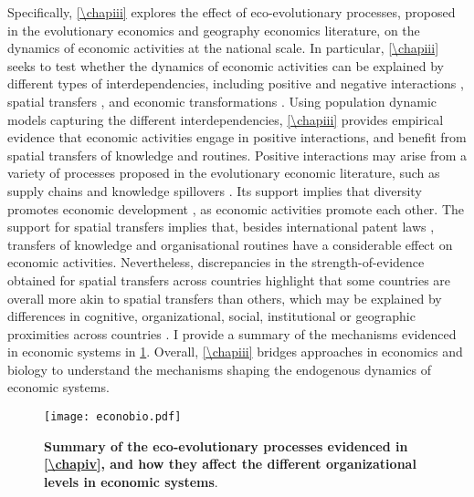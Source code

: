 Specifically, \cref{\chapiii} explores the effect of eco-evolutionary processes, proposed in the evolutionary economics and geography economics literature, on the dynamics of economic activities at the national scale.
% 
In particular, \cref{\chapiii} seeks to test whether the dynamics of economic activities can be explained by different types of interdependencies, including positive \xxx and negative interactions \xxx, spatial transfers \xxx, and economic transformations \xxx.
% 
Using population dynamic models capturing the different interdependencies, \cref{\chapiii} provides empirical evidence that economic activities engage in positive interactions, and benefit from spatial transfers of knowledge and routines.
% 
Positive interactions may arise from a variety of processes proposed in the evolutionary economic literature, such as supply chains \citep{Ozman2009,Saavedra2009a} and knowledge spillovers \citep{Menon2015}. 
% 
Its support implies that diversity promotes economic development \citep{Hidalgo2018}, as economic activities promote each other.
% 
The support for spatial transfers implies that, besides international patent laws \xxx, transfers of knowledge and organisational routines have a considerable effect on economic activities. Nevertheless, discrepancies in the strength-of-evidence obtained for spatial transfers across countries highlight that some countries are overall more akin to spatial transfers than others, which may be explained by differences in cognitive, organizational, social, institutional or geographic proximities across countries \xxx .
% 
I provide a summary of the mechanisms evidenced in economic systems in \cref{fig:summary_econobio}. Overall, \cref{\chapiii} bridges approaches in economics and biology to understand the mechanisms shaping the endogenous dynamics of economic systems.

\begin{figure}[t]
    \centering
    \texttt{[image: econobio.pdf]}
    \caption{\textbf{Summary of the eco-evolutionary processes evidenced in \cref{\chapiv}, and how they affect the different organizational levels in economic systems}.}
    \label{fig:summary_econobio}
\end{figure}

% 

% 

